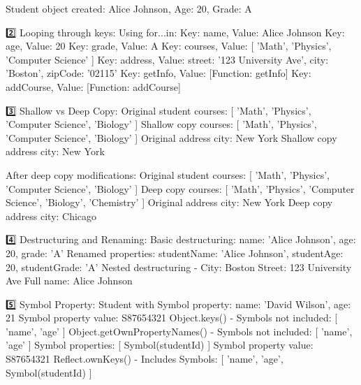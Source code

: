 Student object created:
Alice Johnson, Age: 20, Grade: A

2️⃣ Looping through keys:
Using for...in:
Key: name, Value: Alice Johnson
Key: age, Value: 20
Key: grade, Value: A
Key: courses, Value: [ 'Math', 'Physics', 'Computer Science' ]
Key: address, Value: { street: '123 University Ave', city: 'Boston', zipCode: '02115' }
Key: getInfo, Value: [Function: getInfo]
Key: addCourse, Value: [Function: addCourse]

3️⃣ Shallow vs Deep Copy:
Original student courses: [ 'Math', 'Physics', 'Computer Science', 'Biology' ]
Shallow copy courses: [ 'Math', 'Physics', 'Computer Science', 'Biology' ]
Original address city: New York
Shallow copy address city: New York

After deep copy modifications:
Original student courses: [ 'Math', 'Physics', 'Computer Science', 'Biology' ]
Deep copy courses: [ 'Math', 'Physics', 'Computer Science', 'Biology', 'Chemistry' ]
Original address city: New York
Deep copy address city: Chicago

4️⃣ Destructuring and Renaming:
Basic destructuring: { name: 'Alice Johnson', age: 20, grade: 'A' }
Renamed properties: { studentName: 'Alice Johnson', studentAge: 20, studentGrade: 'A' }
Nested destructuring - City: Boston Street: 123 University Ave
Full name: Alice Johnson

5️⃣ Symbol Property:
Student with Symbol property: { name: 'David Wilson', age: 21 }
Symbol property value: S87654321
Object.keys() - Symbols not included: [ 'name', 'age' ]
Object.getOwnPropertyNames() - Symbols not included: [ 'name', 'age' ]
Symbol properties: [ Symbol(studentId) ]
Symbol property value: S87654321
Reflect.ownKeys() - Includes Symbols: [ 'name', 'age', Symbol(studentId) ]